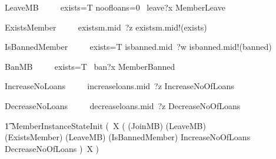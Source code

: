 \documentclass{article}
\begin{document}
\begin{circusaction}
     LeaveMB ~~\circdef~~ \lcircguard exists=T \land noofloans=0 \rcircguard  \circguard\ leave?x \then \lschexpract MemberLeave \rschexpract \\
\end{circusaction}

\begin{circusaction}
     ExistsMember ~~\circdef~~ existsm.mid~?z \then existsm.mid!(exists) \then \Skip \\
\end{circusaction}

\begin{circusaction}
     IsBannedMember ~~\circdef~~ \lcircguard exists=T \rcircguard \circguard isbanned.mid~?w \then isbanned.mid!(banned) \then \Skip \\
\end{circusaction}

\begin{circusaction}
     BanMB ~~\circdef~~ \lcircguard exists=T \rcircguard  \circguard\ ban?x \then \lschexpract MemberBanned \rschexpract \\
\end{circusaction}

\begin{circusaction}
     IncreaseNoLoans ~~\circdef~~ increaseloans.mid~?z \then \lschexpract IncreaseNoOfLoans \rschexpract \\
\end{circusaction}

\begin{circusaction}
     DecreaseNoLoans ~~\circdef~~ decreaseloans.mid~?z \then \lschexpract DecreaseNoOfLoans \rschexpract \\
\end{circusaction}

\begin{circusaction}
   \t1 \circspot \lschexpract MemberInstanceStateInit \rschexpract \circseq (\circmu\ X \circspot (
   					(JoinMB)
					\extchoice
					(LeaveMB)\\
					\extchoice
					(ExistsMember)
					\extchoice
					(LeaveMB)
					\extchoice
					(IsBannedMember)
					\extchoice
					\lschexpract IncreaseNoOfLoans \rschexpract\\
					\extchoice
					\lschexpract DecreaseNoOfLoans \rschexpract)\
					\circseq X )
\end{circusaction}

\begin{circus}
\circend
\end{circus}
\end{document}
